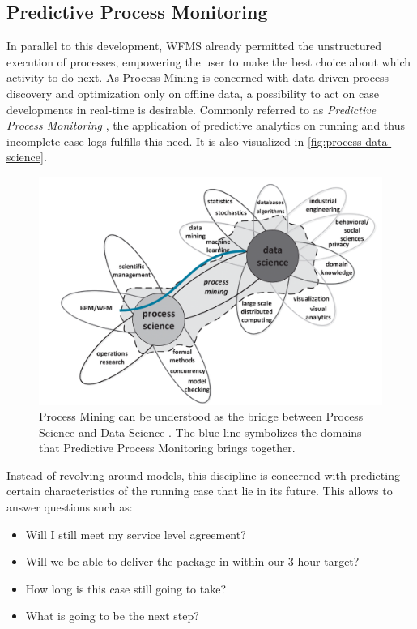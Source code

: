\subsection{Predictive Process Monitoring}
In parallel to this development, WFMS already permitted the unstructured execution of processes, empowering the user to make the best choice about which activity to do next. 
As Process Mining is concerned with data-driven process discovery and optimization only on offline data, a possibility to act on case developments in real-time is desirable. Commonly referred to as \textit{Predictive Process Monitoring} \cite{francescomarino2015, schoenig2018}, the application of predictive analytics on running and thus incomplete case logs fulfills this need. It is also visualized in \autoref{fig:process-data-science}.

\begin{figure}
    \centering
    \includegraphics[width=\textwidth]{gfx/process-data-science.png}
    \caption{Process Mining can be understood as the bridge between Process Science and Data Science \cite[p.18]{Aalst2016}. The blue line symbolizes the domains that Predictive Process Monitoring brings together.}
    \label{fig:process-data-science}
\end{figure}

Instead of revolving around models, this discipline is concerned with predicting certain characteristics of the running case that lie in its future. This allows to answer questions such as:

\begin{itemize}
    \item Will I still meet my service level agreement?
    \item Will we be able to deliver the package in within our 3-hour target?
    \item How long is this case still going to take?
    \item What is going to be the next step?
\end{itemize}

